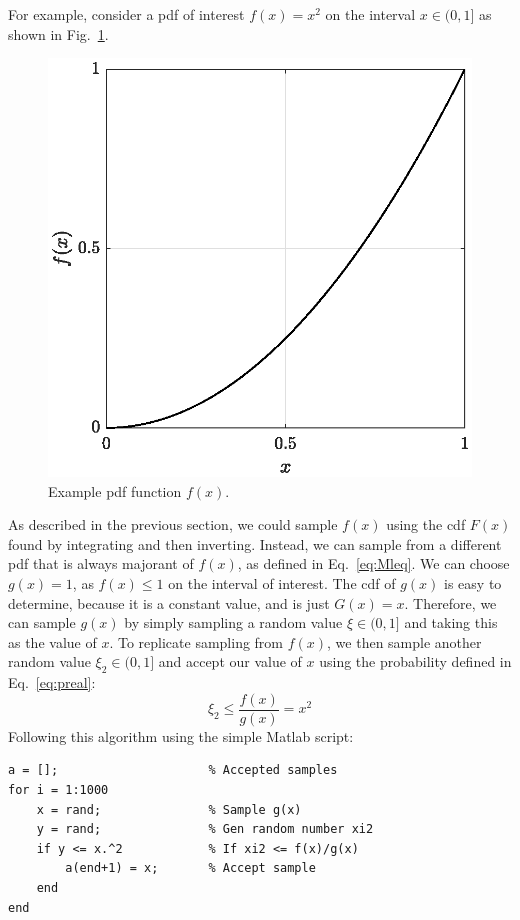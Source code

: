 For example, consider a
\gls{pdf} of interest $f(x) = x^2$ on the interval $x \in (0,1]$ as shown
in Fig.~\ref{fig:circle_square}.
\begin{figure}[hbt]
  \centering
  \includegraphics[scale=0.75]{images/circle}
  \caption{Example \acrshort{pdf} function $f(x)$.}
  \label{fig:circle_square}
\end{figure}
As described in the previous section, we could sample $f(x)$ using the
\gls{cdf} $F(x)$ found by integrating and then inverting. Instead, we can sample from a
different \gls{pdf} that is always majorant of $f(x)$, as defined in
Eq.~\eqref{eq:Mleq}. We can choose $g(x) = 1$, as $f(x) \leq 1$ on
the interval of interest. The \gls{cdf} of $g(x)$ is easy to
determine, because it is a constant value, and is just $G(x) =
x$. Therefore, we can sample $g(x)$ by simply sampling a random value $\xi
\in (0,1]$ and taking this as the value of $x$. To replicate sampling
from $f(x)$, we then sample another random value $\xi_2 \in (0,1]$ and
accept our value of $x$ using the probability defined in Eq.~\eqref{eq:preal}:
\begin{equation*}
  \xi_2 \leq \frac{f(x)}{g(x)} = x^2
\end{equation*}
Following this algorithm using the simple Matlab script:
\begin{lstlisting}
a = [];                     % Accepted samples
for i = 1:1000
    x = rand;               % Sample g(x)
    y = rand;               % Gen random number xi2
    if y <= x.^2            % If xi2 <= f(x)/g(x)
        a(end+1) = x;       % Accept sample
    end
end
\end{lstlisting}
